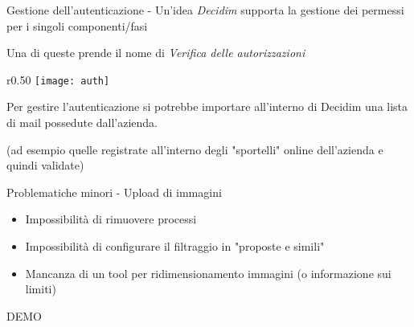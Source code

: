 \begin{frame}{Gestione dell'autenticazione - Un'idea}
  \emph{Decidim} supporta la gestione dei permessi per i singoli componenti/fasi

  Una di queste prende il nome di \emph{Verifica delle autorizzazioni}

  \begin{wrapfigure}{r}{0.50\textwidth}
    \centering
    \texttt{[image: auth]}
  \end{wrapfigure}

  Per gestire l'autenticazione si potrebbe importare all'interno di Decidim una lista di mail possedute dall'azienda.

  (ad esempio quelle registrate all'interno degli "sportelli" online dell'azienda e quindi validate)

\end{frame}
\begin{frame}{Problematiche minori - Upload di immagini}

  \begin{itemize}
    \item<1,2> Impossibilità di rimuovere processi
    \item<1,2> Impossibilità di configurare il filtraggio in "proposte e simili"
    \item<2> Mancanza di un tool per ridimensionamento immagini (o informazione sui limiti)
  \end{itemize}
\end{frame}
{
\begin{frame}[standout]
  \huge
  DEMO

\end{frame}
}
